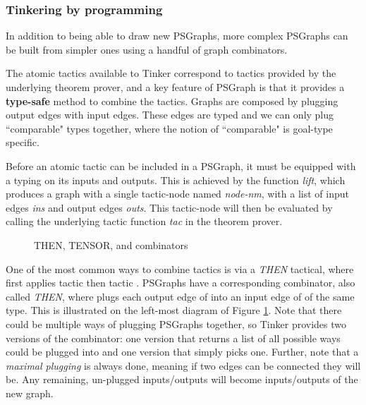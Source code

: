 \documentclass[submission,copyright,creativecommons]{eptcs}
\begin{document}
\subsubsection{Tinkering by programming}

In addition to being able to draw new PSGraphs, more complex PSGraphs can be built from simpler ones using a handful of graph combinators.

The atomic tactics available to Tinker correspond to tactics provided by the underlying theorem prover, and a key feature of PSGraph is that it provides a \textbf{type-safe} method to combine the tactics. Graphs are composed by plugging output edges with input edges. These edges are typed and we can only plug ``comparable" types together, where the notion of ``comparable" is goal-type specific. 

Before an atomic tactic can be included in a PSGraph, it must be equipped with a typing on its inputs and outputs. This is achieved by the function \textit{lift}, which produces a graph with a single tactic-node named \textit{node-nm}, with a list of input edges \textit{ins} and output edges \textit{outs}. This tactic-node will then be evaluated by calling the underlying tactic function \textit{tac} in the theorem prover.

\begin{figure}[h]
  \centering
    \vspace{-7pt}
  \caption{\label{fig:then-and-tensor} THEN, TENSOR, and  combinators}
\end{figure}

One of the most common ways to combine tactics is via a \emph{THEN} tactical, where  first applies tactic  then tactic . PSGraphs have a corresponding combinator, also called \textit{THEN}, where  plugs each output edge of  into an input edge of  
of the same type. This is illustrated on the left-most diagram of Figure  \ref{fig:then-and-tensor}. Note that there could be multiple ways of plugging PSGraphs together, so Tinker provides two versions of the combinator: one version that returns a list of all possible ways  could be plugged into  and one version that simply picks one. Further, note that a \emph{maximal plugging} is always done, meaning if two edges can be connected they will be. Any remaining, un-plugged inputs/outputs will become inputs/outputs of the new graph.
\end{document}
